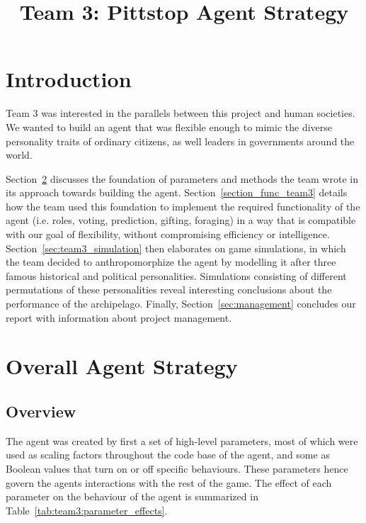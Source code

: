 \documentclass{article}
\title{Team 3: Pittstop Agent Strategy}
\begin{document}
\maketitle

\section{Introduction}

Team 3 was interested in the parallels between this project and human societies. We wanted to build an agent that was flexible enough to mimic the diverse personality traits of ordinary citizens, as well leaders in governments around the world.

Section~\ref{sec:overall_strat} discusses the foundation of parameters and methods the team wrote in its approach towards building the agent. Section~\ref{section_func_team3} details how the team used this foundation to implement the required functionality of the agent (i.e. roles, voting, prediction, gifting, foraging) in a way that is compatible with our goal of flexibility, without compromising efficiency or intelligence. Section~\ref{sec:team3_simulation} then elaborates on game simulations, in which the team decided to anthropomorphize the agent by modelling it after three famous historical and political personalities. Simulations consisting of different permutations of these personalities reveal interesting conclusions about the performance of the archipelago. Finally, Section~\ref{sec:management} concludes our report with information about project management.

\section{Overall Agent Strategy}
\label{sec:overall_strat}

\subsection{Overview}
\label{sec:overview}


The agent was created by first a set of high-level parameters, most of which were used as scaling factors throughout the code base of the agent, and some as Boolean values that turn on or off specific behaviours. These parameters hence govern the agents interactions with the rest of the game. The effect of each parameter on the behaviour of the agent is summarized in Table~\ref{tab:team3:parameter_effects}. \\
\end{document}
